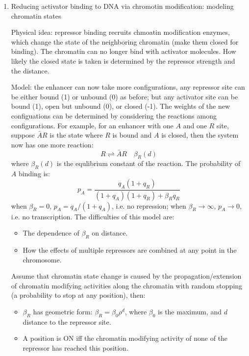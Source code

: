 \documentclass[11pt]{article}
\begin{document}
\begin{enumerate}
\begin{enumerate}
\item{Reducing activator binding to DNA via chromotin modification: modeling chromatin states}

Physical idea: repressor binding recruits chmoatin modification enzymes, which change the state of the neighboring chromatin (make them closed for binding). The chromatin can no longer bind with activator molecules. How likely the closed state is taken is determined by the repressor strength and the distance. 

Model: the enhancer can now take more configurations, any repressor site can be either bound (1) or unbound (0) as before; but any activator site can be bound (1), open but unbound (0), or closed (-1). The weights of the new configuations can be determined by considering the reactions among configurations. For example, for an enhancer with one $A$ and one $R$ site, suppose $\bar{A}R$ is the state where $R$ is bound and $A$ is closed, then the system now has one more reaction: 
\begin{equation}
R \rightleftharpoons \bar{A}R \quad \beta_R(d)
\end{equation}
where $\beta_R(d)$ is the equlibrium constant of the reaction. The probability of $A$ binding is: 
\begin{equation}
p_A = \frac{q_A (1 + q_R)}{(1 + q_A)(1 + q_R) + \beta_{R} q_R}
\end{equation}  
when $\beta_R = 0$, $p_A = q_A/(1+q_A)$, i.e. no repression; when $\beta_R \rightarrow \infty$, $p_A \rightarrow 0$, i.e. no transcription. The difficulties of this model are: 
\begin{itemize}
\item The dependence of $\beta_R$ on distance. 
\item How the effects of multiple repressors are combined at any point in the chromosome. 
\end{itemize}
Assume that chromatin state change is caused by the propagation/extension of chromatin modifying activities along the chromatin with random stopping (a probability to stop at any position), then: 
\begin{itemize}
\item $\beta_R$ has geometric form: $\beta_R = \beta_0 \rho^d$, where $\beta_0$ is the maximum, and $d$ distance to the repressor site.  
\item A position is ON iff the chromatin modifying activity of none of the repressor has reached this position. 
\end{itemize}


\end{enumerate}
\end{enumerate}
\end{document}
